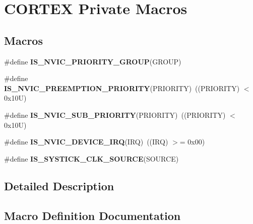 \hypertarget{group___c_o_r_t_e_x___private___macros}{}\section{C\+O\+R\+T\+EX Private Macros}
\label{group___c_o_r_t_e_x___private___macros}
\subsection*{Macros}
\begin{DoxyCompactItemize}
\item 
\#define {\bfseries I\+S\+\_\+\+N\+V\+I\+C\+\_\+\+P\+R\+I\+O\+R\+I\+T\+Y\+\_\+\+G\+R\+O\+UP}(G\+R\+O\+UP)
\item 
\mbox{\label{group___c_o_r_t_e_x___private___macros_gaf30fd8f5960c2e28a772d8f16bb156dd}} 
\#define {\bfseries I\+S\+\_\+\+N\+V\+I\+C\+\_\+\+P\+R\+E\+E\+M\+P\+T\+I\+O\+N\+\_\+\+P\+R\+I\+O\+R\+I\+TY}(P\+R\+I\+O\+R\+I\+TY)~((P\+R\+I\+O\+R\+I\+TY) $<$ 0x10\+U)
\item 
\mbox{\label{group___c_o_r_t_e_x___private___macros_ga010705bc997dcff935b965b372cba61d}} 
\#define {\bfseries I\+S\+\_\+\+N\+V\+I\+C\+\_\+\+S\+U\+B\+\_\+\+P\+R\+I\+O\+R\+I\+TY}(P\+R\+I\+O\+R\+I\+TY)~((P\+R\+I\+O\+R\+I\+TY) $<$ 0x10\+U)
\item 
\mbox{\label{group___c_o_r_t_e_x___private___macros_ga9b8dcac4ed8e88c14d9bb04e369dad6a}} 
\#define {\bfseries I\+S\+\_\+\+N\+V\+I\+C\+\_\+\+D\+E\+V\+I\+C\+E\+\_\+\+I\+RQ}(I\+RQ)~((I\+RQ) $>$= 0x00)
\item 
\#define {\bfseries I\+S\+\_\+\+S\+Y\+S\+T\+I\+C\+K\+\_\+\+C\+L\+K\+\_\+\+S\+O\+U\+R\+CE}(S\+O\+U\+R\+CE)
\end{DoxyCompactItemize}


\subsection{Detailed Description}


\subsection{Macro Definition Documentation}
\mbox{\label{group___c_o_r_t_e_x___private___macros_ga6569304a39fe4f91bd59b6a586c8ede9}} 
